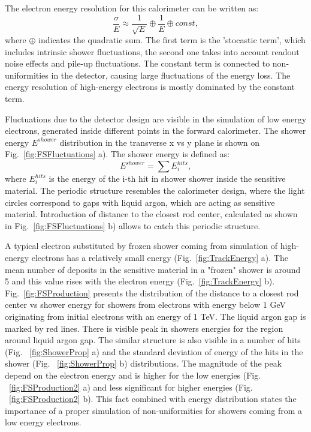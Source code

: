 The electron energy resolution for this calorimeter can be written as:
\begin{equation}\label{eq:EMResoultion}
\frac{\sigma}{E} \approx \frac{1}{\sqrt{E}}	\oplus \frac{1}{E} 	\oplus const,
\end{equation}
where $\oplus$ indicates the quadratic sum. The first term is the 'stocastic term', which includes intrinsic shower fluctuations, the second  one takes into account readout noise effects and pile-up fluctuations. The constant term is connected to non-uniformities in the detector, causing large fluctuations of the energy loss. The energy resolution of high-energy electrons is mostly dominated by the constant term. 

Fluctuations due to the detector design are visible in the simulation of low energy electrons, generated inside different points in the forward calorimeter. The shower energy $E^{shower}$ distribution in the transverse x vs y plane is shown on Fig.~\ref{fig:FSFluctuations} a). The shower energy is defined as:
\begin{equation}
E^{shower}=\sum E_i^{hits},
\end{equation}
where $E_i^{hits}$ is the energy of the i-th hit in shower shower inside the sensitive material. The periodic structure resembles the calorimeter design, where the light circles correspond to gaps with liquid argon, which are acting as sensitive material. Introduction of distance to the closest rod center, calculated as shown in Fig.~\ref{fig:FSFluctuations} b) allows to catch this periodic structure.

A typical electron substituted by frozen shower coming from simulation of high-energy electrons has a relatively small energy (Fig.~\ref{fig:TrackEnergy} a). The mean number of deposits in the sensitive material in a "frozen" shower is around 5 and this value rises with the electron energy (Fig.~\ref{fig:TrackEnergy} b).  Fig.~\ref{fig:FSProduction} presents the distribution of the distance to a closest rod center vs shower energy for showers from electrons with energy below 1 GeV originating from initial electrons with an energy of 1 TeV. The liquid argon gap is marked by red lines. There is visible peak in showers energies for the region around liquid argon gap. The similar structure is also visible in a number of hits  (Fig. ~\ref{fig:ShowerProp} a) and the standard deviation of energy of the hits in the shower (Fig. ~\ref{fig:ShowerProp} b) distributions. The magnitude of the peak depend on the electron energy and is higher for the low energies (Fig. ~\ref{fig:FSProduction2} a) and less significant for higher energies (Fig. ~\ref{fig:FSProduction2} b).  This fact combined with energy distribution states the importance of a proper simulation of non-uniformities for showers coming from a low energy electrons.





